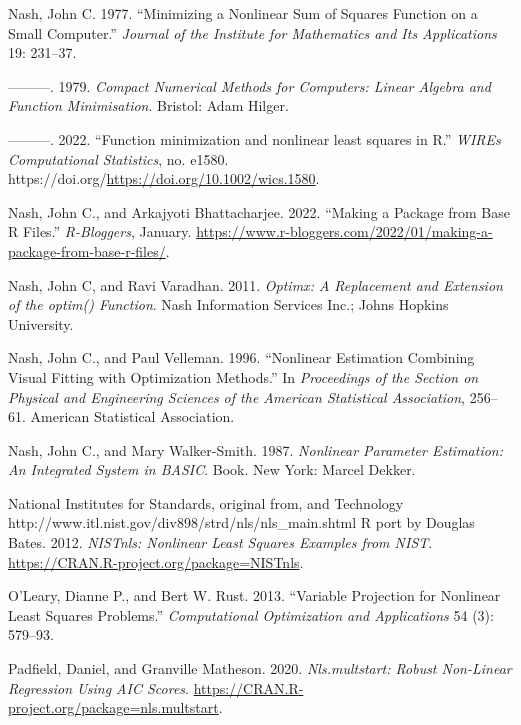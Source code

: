 \begin{CSLReferences}
Nash, John C. 1977. {``Minimizing a Nonlinear Sum of Squares Function on a Small Computer.''} \emph{Journal of the Institute for Mathematics and Its Applications} 19: 231--37.

---------. 1979. \emph{Compact Numerical Methods for Computers: Linear Algebra and Function Minimisation}. Bristol: Adam Hilger.

---------. 2022. {``{Function minimization and nonlinear least squares in R}.''} \emph{WIREs Computational Statistics}, no. e1580. https://doi.org/\url{https://doi.org/10.1002/wics.1580}.

Nash, John C., and Arkajyoti Bhattacharjee. 2022. {``Making a Package from Base {R} Files.''} \emph{R-Bloggers}, January. \url{https://www.r-bloggers.com/2022/01/making-a-package-from-base-r-files/}.

Nash, John C, and Ravi Varadhan. 2011. \emph{\emph{Optimx}: A Replacement and Extension of the {optim()} Function}. Nash Information Services Inc.; Johns Hopkins University.

Nash, John C., and Paul Velleman. 1996. {``Nonlinear Estimation Combining Visual Fitting with Optimization Methods.''} In \emph{Proceedings of the Section on Physical and Engineering Sciences of the American Statistical Association}, 256--61. American Statistical Association.

Nash, John C., and Mary Walker-Smith. 1987. \emph{Nonlinear Parameter Estimation: An Integrated System in BASIC}. Book. New York: Marcel Dekker.

National Institutes for Standards, original from, and Technology http://www.itl.nist.gov/div898/strd/nls/nls\_main.shtml R port by Douglas Bates. 2012. \emph{NISTnls: Nonlinear Least Squares Examples from NIST}. \url{https://CRAN.R-project.org/package=NISTnls}.

O'Leary, Dianne P., and Bert W. Rust. 2013. {``Variable Projection for Nonlinear Least Squares Problems.''} \emph{Computational Optimization and Applications} 54 (3): 579--93.

Padfield, Daniel, and Granville Matheson. 2020. \emph{Nls.multstart: Robust Non-Linear Regression Using AIC Scores}. \url{https://CRAN.R-project.org/package=nls.multstart}.


\end{CSLReferences}
